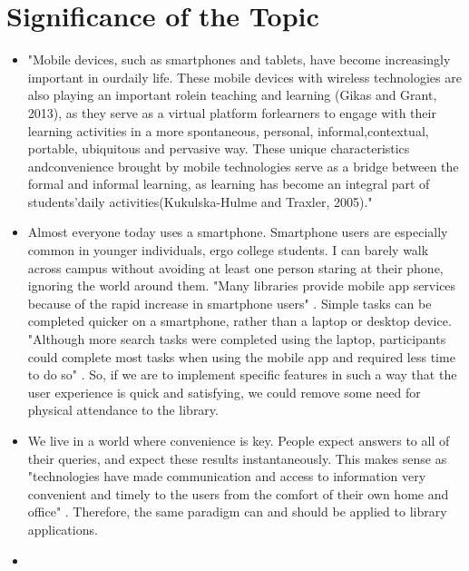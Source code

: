 \section{Significance of the Topic}

    \begin{itemize}
        \item
        "Mobile devices, such as smartphones and tablets, have become increasingly important in ourdaily life. These mobile devices with wireless technologies are also playing an important rolein teaching and learning (Gikas and Grant, 2013), as they serve as a virtual platform forlearners to engage with their learning activities in a more spontaneous, personal, informal,contextual, portable, ubiquitous and pervasive way. These unique characteristics andconvenience brought by mobile technologies serve as a bridge between the formal and informal learning, as learning has become an integral part of students’daily activities(Kukulska-Hulme and Traxler, 2005)." \cite{Mobile_Apps_Between_Hong_Kong_and_Japan}
        \item
        Almost everyone today uses a smartphone. Smartphone users are especially common in younger individuals, ergo college students. I can barely walk across campus without avoiding at least one person staring at their phone, ignoring the world around them. "Many libraries provide mobile app services because of the rapid increase in smartphone users" \cite{undergrad_ma}. Simple tasks can be completed quicker on a smartphone, rather than a laptop or desktop device. "Although more search tasks were completed using the laptop, participants could complete most tasks when using the mobile app and required less time to do so" \cite{undergrad_ma}. So, if we are to implement specific features in such a way that the user experience is quick and satisfying, we could remove some need for physical attendance to the library.
        \item
        We live in a world where convenience is key. People expect answers to all of their queries, and expect these results instantaneously. This makes sense as "technologies have made communication and access to information very convenient and timely to the users from the comfort of their own home and office" \cite{mob_ph_app_aca_lib}. Therefore, the same paradigm can and should be applied to library applications.
        \item

\end{itemize}
